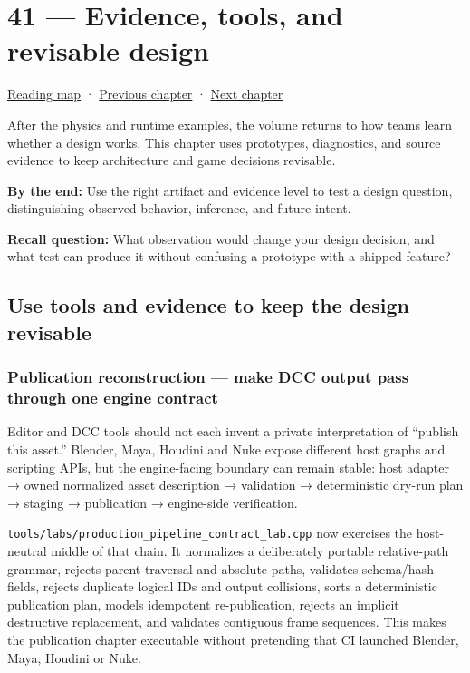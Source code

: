 \hypertarget{06-engine-ii-ch041}{}
\section{41 --- Evidence, tools, and revisable design}\label{evidence-tools-and-revisable-design}

\href{Chapter\%20Edition/03\%20-\%20Game\%20Engine/00\%20-\%20Reading\%20Map}{Reading map} · \hyperref[06-engine-ii-ch040]{Previous chapter} · \hyperref[06-engine-ii-ch042]{Next chapter}

After the physics and runtime examples, the volume returns to how teams learn whether a design works. This chapter uses prototypes, diagnostics, and source evidence to keep architecture and game decisions revisable.

\textbf{By the end:} Use the right artifact and evidence level to test a design question, distinguishing observed behavior, inference, and future intent.

\textbf{Recall question:} What observation would change your design decision, and what test can produce it without confusing a prototype with a shipped feature?

\subsection{Use tools and evidence to keep the design revisable}\label{use-tools-and-evidence-to-keep-the-design-revisable}

\subsubsection{Publication reconstruction --- make DCC output pass through one engine contract}\label{publication-reconstruction-make-dcc-output-pass-through-one-engine-contract}

Editor and DCC tools should not each invent a private interpretation of ``publish this asset.'' Blender, Maya, Houdini and Nuke expose different host graphs and scripting APIs, but the engine-facing boundary can remain stable: host adapter → owned normalized asset description → validation → deterministic dry-run plan → staging → publication → engine-side verification.

\texttt{tools/labs/production\_pipeline\_contract\_lab.cpp} now exercises the host-neutral middle of that chain. It normalizes a deliberately portable relative-path grammar, rejects parent traversal and absolute paths, validates schema/hash fields, rejects duplicate logical IDs and output collisions, sorts a deterministic publication plan, models idempotent re-publication, rejects an implicit destructive replacement, and validates contiguous frame sequences. This makes the publication chapter executable without pretending that CI launched Blender, Maya, Houdini or Nuke.


